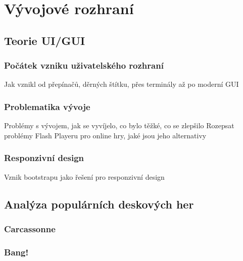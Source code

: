 \chapter{Vývojové rozhraní}
\label{ch:development}

\section{Teorie UI/GUI}
\label{sec:ui-gui-theory}

\subsection{Počátek vzniku uživatelského rozhraní}
\label{subsec:ui-gui-theory-beginning}
Jak vznikl od přepínačů, děrných štítku, přes terminály až po moderní GUI

\subsection{Problematika vývoje}
\label{subsec:ui-gui-theory-problems}
Problémy s vývojem, jak se vyvíjelo, co bylo těžké, co se zlepšilo
Rozepsat problémy Flash Playeru pro online hry, jaké jsou jeho alternativy

\subsection{Responzivní design}
\label{subsec:ui-gui-theory-responsive-design}
Vznik bootstrapu jako řešení pro responzivní design


\section{Analýza populárních deskových her}
\label{sec:popular-board-games-analysis}

\subsection{Carcassonne}
\label{subsec:popular-board-games-analysis-carcassonne}

\subsection{Bang!}
\label{subsec:popular-board-games-analysis-bang}

